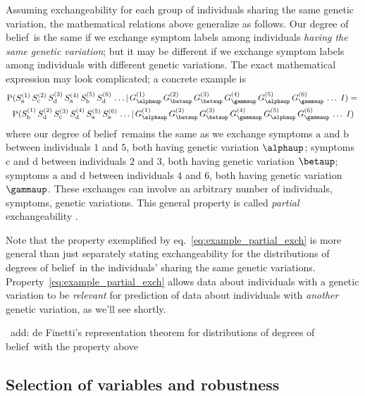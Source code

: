 \documentclass[\ifafour a4paper,12pt,\else a5paper,10pt,\fi%
onecolumn,oneside,article,%
british%
]{memoir}
\theoremstyle{remark}
\theoremstyle{innote}
\renewcommand*{\cites}{\parencites}
\newcommand*{\p}{\mathrm{P}}%
\renewcommand*{\|}{\mathpunct{|}}
\newcommand*{\eqn}{eq.}%
\newcommand*{\puzzle}{\maltese}
\newcommand{\mynote}[1]{ {\color{notecolour}\puzzle\ #1}}
\newcommand*{\dob}{degree of belief}
\newcommand*{\dobs}{degrees of belief}
\newcommand*{\yI}{I}
\newcommand*{\yGi}[1]{G^{(#1)}}
\newcommand*{\ySi}[1]{S^{(#1)}}
\begin{document}
Assuming exchangeability for each group of individuals sharing the same
genetic variation, the mathematical relations above generalize as follows.
Our \dob\ is the same if we exchange symptom labels among individuals
\emph{having the same genetic variation}; but it may be different if we
exchange symptom labels among individuals with different genetic
variations. The exact mathematical expression may look complicated; a
concrete example is
\begin{multline}
  \label{eq:example_partial_exch}
  \p(\ySi{1}_{\text{a}}\, \ySi{2}_{\text{c}}\, \ySi{3}_{\text{d}}\,
  \ySi{4}_{\text{a}}\, \ySi{5}_{\text{b}}\, \ySi{6}_{\text{d}}\,\dotso \|
  \yGi{1}_{\alphaup}\, \yGi{2}_{\betaup}\, \yGi{3}_{\betaup}\,
  \yGi{4}_{\gammaup}\, \yGi{5}_{\alphaup}\, \yGi{6}_{\gammaup}\,\dotso
  \;\yI)
  ={}\\
  \p(\ySi{1}_{\text{b}}\, \ySi{2}_{\text{d}}\, \ySi{3}_{\text{c}}\,
  \ySi{4}_{\text{d}}\, \ySi{5}_{\text{a}}\, \ySi{6}_{\text{a}}\,\dotso \|
  \yGi{1}_{\alphaup}\, \yGi{2}_{\betaup}\, \yGi{3}_{\betaup}\,
  \yGi{4}_{\gammaup}\, \yGi{5}_{\alphaup}\, \yGi{6}_{\gammaup}\,\dotso
  \;\yI)
\end{multline}
where our \dob\ remains the same as we exchange symptoms $\text{a}$
and $\text{b}$ between individuals $1$ and $5$, both having genetic
variation $\alphaup$; symptoms $\text{c}$ and $\text{d}$ between
individuals $2$ and $3$, both having genetic variation $\betaup$; symptoms
$\text{a}$ and $\text{d}$ between individuals $4$ and $6$, both having
genetic variation $\gammaup$. These exchanges can involve an arbitrary
number of individuals, symptoms, genetic variations. This general property
is called \emph{partial} exchangeability
\cites{definetti1938,diaconisetal1980b,diaconis1988}[for a connection with
sampling theory see][]{sugden1982,sugden1993}.

Note that the property exemplified by \eqn~\eqref{eq:example_partial_exch}
is more general than just separately stating exchangeability for the
distributions of \dobs\ in the individuals' sharing the same genetic
variations. Property~\eqref{eq:example_partial_exch} allows data about
individuals with a genetic variation to be \emph{relevant} for prediction
of data about individuals with \emph{another} genetic variation, as we'll
see shortly.


\mynote{add: de Finetti's representation theorem for distributions of
  \dobs\ with the property above}

\subsection{Selection of variables and robustness}
\label{sec:variable_selection_robustness}
\end{document}
